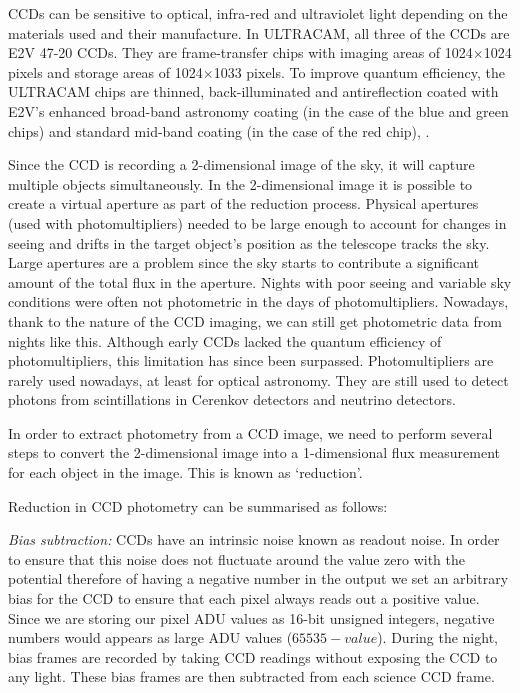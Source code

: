 CCDs can be sensitive to optical, infra-red and ultraviolet light depending on the materials used and their manufacture. In ULTRACAM, all three of the CCDs are E2V 47-20 CCDs. They are frame-transfer chips with imaging areas of 1024$\times$1024 pixels and storage areas of 1024$\times$1033 pixels.  To improve quantum efficiency, the ULTRACAM chips are thinned, back-illuminated and antireflection coated with E2V's enhanced broad-band astronomy coating (in the case of the blue and green chips) and standard mid-band coating (in the case of the red chip), \citep{dhillon07}.

Since the CCD is recording a 2-dimensional image of the sky, it will capture multiple objects simultaneously. In the 2-dimensional image it is possible to create a virtual aperture as part of the reduction process. Physical apertures (used with photomultipliers) needed to be large enough to account for changes in seeing and drifts in the target object's position as the telescope tracks the sky. Large apertures are a problem since the sky starts to contribute a significant amount of the total flux in the aperture. Nights with poor seeing and variable sky conditions were often not photometric in the days of photomultipliers. Nowadays, thank to the nature of the CCD imaging, we can still get photometric data from nights like this.  Although early CCDs lacked the quantum efficiency of photomultipliers, this limitation has since been surpassed. Photomultipliers are rarely used nowadays, at least for optical astronomy. They are still used to detect photons from scintillations in Cerenkov detectors and neutrino detectors.  

In order to extract photometry from a CCD image, we need to perform several steps to convert the 2-dimensional image into a 1-dimensional flux measurement for each object in the image. This is known as `reduction'. 

Reduction in CCD photometry can be summarised as follows: 

\emph{Bias subtraction:}
CCDs have an intrinsic noise known as readout noise. In order to ensure that this noise does not fluctuate around the value zero with the potential therefore of having a negative number in the output we set an arbitrary bias for the CCD to ensure that each pixel always reads out a positive value. Since we are storing our pixel ADU values as 16-bit unsigned integers, negative numbers would appears as large ADU values ($65535 - value$). During the night, bias frames are recorded by taking CCD readings without exposing the CCD to any light. These bias frames are then subtracted from each science CCD frame. 


